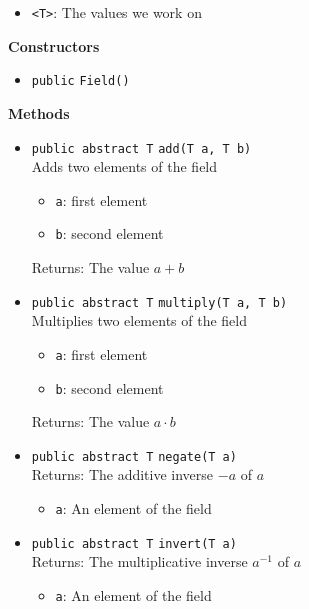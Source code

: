 \begin{itemize}
\item \lstinline|<T>|: The values we work on
\end{itemize}


\textbf{Constructors}
\begin{itemize}
\item \lstinline|public| \lstinline|Field|\lstinline|()|




\end{itemize}


\textbf{Methods}
\begin{itemize}
\item \lstinline|public abstract T| \lstinline|add|\lstinline|(T a, T b)|\\
Adds two elements of the field
\begin{itemize}
\item \lstinline|a|: first element
\item \lstinline|b|: second element
\end{itemize}

Returns: The value $a + b$

\item \lstinline|public abstract T| \lstinline|multiply|\lstinline|(T a, T b)|\\
Multiplies two elements of the field
\begin{itemize}
\item \lstinline|a|: first element
\item \lstinline|b|: second element
\end{itemize}

Returns: The value $a \cdot b$

\item \lstinline|public abstract T| \lstinline|negate|\lstinline|(T a)|\\
Returns: The additive inverse $-a$ of $a$
\begin{itemize}
\item \lstinline|a|: An element of the field
\end{itemize}



\item \lstinline|public abstract T| \lstinline|invert|\lstinline|(T a)|\\
Returns: The multiplicative inverse $a^{-1}$ of $a$
\begin{itemize}
\item \lstinline|a|: An element of the field
\end{itemize}




\end{itemize}
